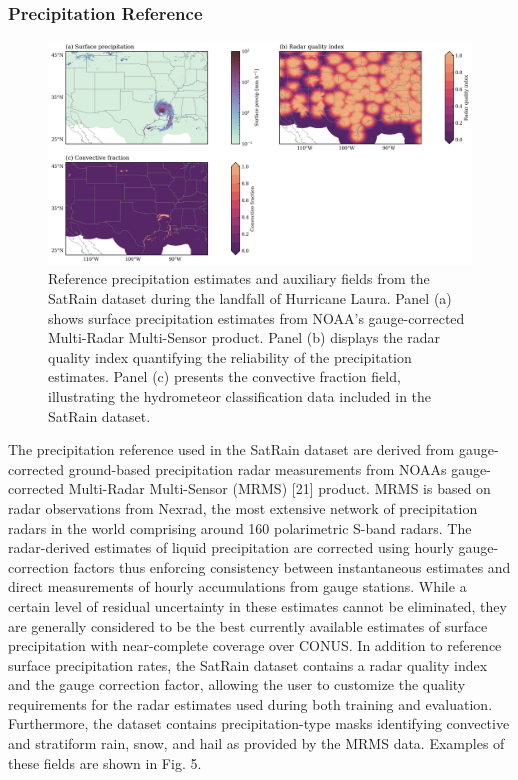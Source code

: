 \documentclass[11pt]{article}
\begin{document}
\subsubsection{Precipitation Reference}

\begin{figure}[htbp] %
	\centering
	\includegraphics[width=1.0\textwidth]{figures/fig05}
	\caption{
		Reference precipitation estimates and auxiliary fields from the SatRain
		dataset during the landfall of Hurricane Laura. Panel (a) shows surface
		precipitation estimates from NOAA’s gauge-corrected Multi-Radar
		Multi-Sensor product. Panel (b) displays the radar quality index
		quantifying the reliability of the precipitation estimates. Panel (c)
		presents the convective fraction field, illustrating the hydrometeor
		classification data included in the SatRain dataset.
	}
	\label{fig:observations_geo}
\end{figure}

The precipitation reference used in the SatRain dataset are derived from gauge-corrected ground-based precipitation radar measurements from NOAAs gauge-corrected Multi-Radar Multi-Sensor (MRMS) [21] product. MRMS is based on radar observations from Nexrad, the most extensive network of precipitation radars in the world comprising around 160 polarimetric S-band radars. The radar-derived estimates of liquid precipitation are corrected using hourly gauge-correction factors thus enforcing consistency between instantaneous estimates and direct measurements of hourly accumulations from gauge stations. While a certain level of residual uncertainty in these estimates cannot be eliminated, they are generally considered to be the best currently available estimates of surface precipitation with near-complete coverage over CONUS. In addition to reference surface precipitation rates, the SatRain dataset contains a radar quality index and the gauge correction factor, allowing the user to customize the quality requirements for the radar estimates used during both training and evaluation. Furthermore, the dataset contains precipitation-type masks identifying convective and stratiform rain, snow, and hail as provided by the MRMS data. Examples of these fields are shown in Fig. 5.
\end{document}
